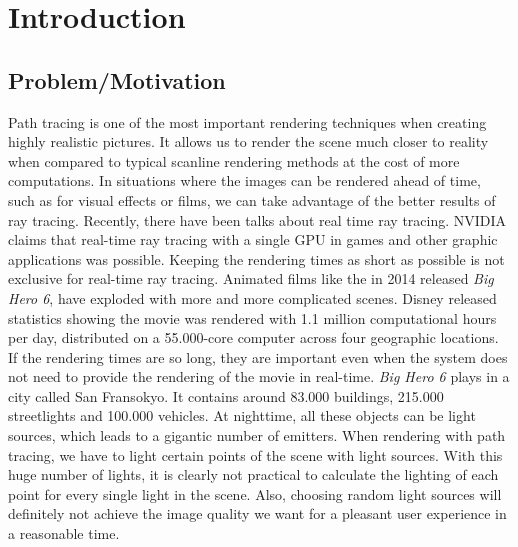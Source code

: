 
\chapter{Introduction}
\label{ch:Introduction}

\section{Problem/Motivation}
\label{sec:Introduction:Motivation}

Path tracing is one of the most important rendering techniques when creating highly realistic pictures. It allows us to render the scene much closer to reality when compared to typical scanline rendering methods at the cost of more computations. In situations where the images can be rendered ahead of time, such as for visual effects or films, we can take advantage of the better results of ray tracing. Recently, there have been talks about real time ray tracing. NVIDIA claims that real-time ray tracing with a single GPU in games and other graphic applications was possible. Keeping the rendering times as short as possible is not exclusive for real-time ray tracing. Animated films like the in 2014 released \textit{Big Hero 6}, have exploded with more and more complicated scenes. Disney released statistics showing the movie was rendered with 1.1 million computational hours per day, distributed on a 55.000-core computer across four geographic locations. If the rendering times are so long, they are important even when the system does not need to provide the rendering of the movie in real-time. \textit{Big Hero 6} plays in a city called San Fransokyo. It contains around 83.000 buildings, 215.000 streetlights and 100.000 vehicles. At nighttime, all these objects can be light sources, which leads to a gigantic number of emitters. When rendering with path tracing, we have to light certain points of the scene with light sources. With this huge number of lights, it is clearly not practical to calculate the lighting of each point for every single light in the scene. Also, choosing random light sources will definitely not achieve the image quality we want for a pleasant user experience in a reasonable time. \cite{BH6,NVIDIA}

